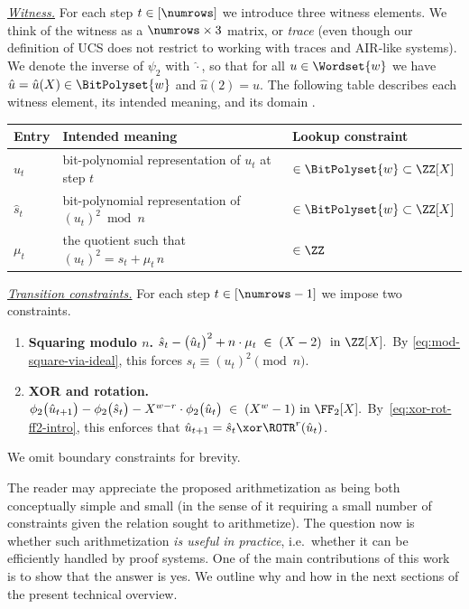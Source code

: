 \medskip
\noindent\emph{\underline{Witness.}}
For each step $t\in[\numrows]$ we introduce three witness elements. We think of the witness as a $\numrows\times 3$ matrix, or \emph{trace} (even though our definition of UCS does not restrict to working with traces and AIR-like systems). 
 We denote the inverse of $\psi_2$ with $\hat{\cdot}$, so that for all $u\in \Wordset{w}$ we have $\hat{u}=\hat{u}(X)\in \BitPolyset{w}$ and $\hat{u}(2) = u$. 
The following table describes each witness element, its intended meaning, and its domain .
\begin{center}
\begin{tabular}{lll}
\toprule
Entry & Intended meaning & Lookup constraint\\
\midrule
$\hat{u}_{t}$ & bit-polynomial representation of $u_{t}$ at step $t$ & $\in\BitPolyset{w}\subset\ZZ[X]$\\
$\hat{s}_{t}$ & bit-polynomial representation of $(u_{t})^2\bmod n$ & $\in\BitPolyset{w}\subset\ZZ[X]$\\
$\mu_{t}$ & the quotient such that $(u_{t})^2 = s_{t} + \mu_{t}\, n $ & $\in\ZZ$\\
\bottomrule
\end{tabular}
\end{center}


\medskip
\noindent\emph{\underline{Transition constraints.}}
For each step $t\in[\numrows-1]$ we impose two constraints.

\begin{enumerate}[leftmargin=*]
\item \textbf{Squaring modulo $n$.}
  \(
    \hat{s}_{t} - \bigl(\hat{u}_{t}\bigr)^2 + n\cdot \mu_{t} \;\in\; (X-2)
    \ \text{ in }  \ZZ[X].
  \)
  By \cref{eq:mod-square-via-ideal},
  this forces $s_{t}\equiv (u_{t})^2\pmod{n}$.

\item \textbf{XOR and rotation.}
  \(
    \phi_2\bigl(\hat{u}_{t+1}\bigr) - \phi_2\bigl(\hat{s}_{t}\bigr)
      - X^{w-r}\cdot\phi_2\bigl(\hat{u}_{t}\bigr)
      \;\in\; (X^w-1) \text{ in } \FF_2[X].
  \)
  By~\eqref{eq:xor-rot-ff2-intro}, this  enforces that $\hat{u}_{t+1} = \hat{s}_{t} \xor \ROTR^r(\hat{u}_{t})$.
\end{enumerate}
%
We omit boundary constraints for brevity. 

The reader may appreciate the proposed arithmetization as being both conceptually simple and small (in the sense of it requiring a small number of constraints given the relation sought to arithmetize). The question now is whether such arithmetization \emph{is useful in practice}, i.e.\ whether it can be efficiently handled by proof systems. One of the main contributions of this work is to show that the answer is yes. We outline why and how in the next sections of the present technical overview. 

